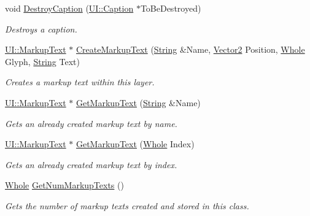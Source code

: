 \begin{DoxyCompactItemize}
void \hyperlink{classphys_1_1UILayer_a5c0ac9bd2b2c41178ccde42812e39210}{DestroyCaption} (\hyperlink{classphys_1_1UI_1_1Caption}{UI::Caption} $\ast$ToBeDestroyed)
\begin{DoxyCompactList}\small\item\em Destroys a caption. \item\end{DoxyCompactList}\item 
\hyperlink{classphys_1_1UI_1_1MarkupText}{UI::MarkupText} $\ast$ \hyperlink{classphys_1_1UILayer_a773435348a970d922f4022a0c5a7959f}{CreateMarkupText} (\hyperlink{namespacephys_aa03900411993de7fbfec4789bc1d392e}{String} \&Name, \hyperlink{classphys_1_1Vector2}{Vector2} Position, \hyperlink{namespacephys_a460f6bc24c8dd347b05e0366ae34f34a}{Whole} Glyph, \hyperlink{namespacephys_aa03900411993de7fbfec4789bc1d392e}{String} Text)
\begin{DoxyCompactList}\small\item\em Creates a markup text within this layer. \item\end{DoxyCompactList}\item 
\hyperlink{classphys_1_1UI_1_1MarkupText}{UI::MarkupText} $\ast$ \hyperlink{classphys_1_1UILayer_a61f5b816aa768a515cb3d31ab2b2088c}{GetMarkupText} (\hyperlink{namespacephys_aa03900411993de7fbfec4789bc1d392e}{String} \&Name)
\begin{DoxyCompactList}\small\item\em Gets an already created markup text by name. \item\end{DoxyCompactList}\item 
\hyperlink{classphys_1_1UI_1_1MarkupText}{UI::MarkupText} $\ast$ \hyperlink{classphys_1_1UILayer_a2f40efc62324c5d2d5c1282f2ea6088d}{GetMarkupText} (\hyperlink{namespacephys_a460f6bc24c8dd347b05e0366ae34f34a}{Whole} Index)
\begin{DoxyCompactList}\small\item\em Gets an already created markup text by index. \item\end{DoxyCompactList}\item 
\hyperlink{namespacephys_a460f6bc24c8dd347b05e0366ae34f34a}{Whole} \hyperlink{classphys_1_1UILayer_a80f4761638d701d8767ad1c0f769985a}{GetNumMarkupTexts} ()
\begin{DoxyCompactList}\small\item\em Gets the number of markup texts created and stored in this class. \item\end{DoxyCompactList}\item 

\end{DoxyCompactItemize}
